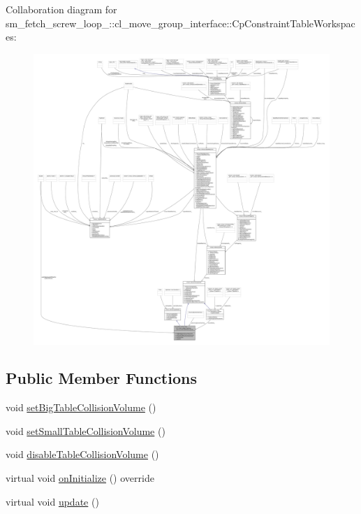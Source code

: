 Collaboration diagram for sm\+\_\+fetch\+\_\+screw\+\_\+loop\+\_\+:\+:cl\+\_\+move\+\_\+group\+\_\+interface\+:\+:Cp\+Constraint\+Table\+Workspaces\+:
\nopagebreak
\begin{figure}[H]
\begin{center}
\leavevmode
\includegraphics[width=350pt]{classsm__fetch__screw__loop__1_1_1cl__move__group__interface_1_1CpConstraintTableWorkspaces__coll__graph}
\end{center}
\end{figure}
\subsection*{Public Member Functions}
\begin{DoxyCompactItemize}
\item 
void \hyperlink{classsm__fetch__screw__loop__1_1_1cl__move__group__interface_1_1CpConstraintTableWorkspaces_ae9bf6937e39e58a069bce3d02b617402}{set\+Big\+Table\+Collision\+Volume} ()
\item 
void \hyperlink{classsm__fetch__screw__loop__1_1_1cl__move__group__interface_1_1CpConstraintTableWorkspaces_a9b66f921573b86d249ecafc3161d1308}{set\+Small\+Table\+Collision\+Volume} ()
\item 
void \hyperlink{classsm__fetch__screw__loop__1_1_1cl__move__group__interface_1_1CpConstraintTableWorkspaces_ad3923e3b459840a1cd0ff9f43821fecf}{disable\+Table\+Collision\+Volume} ()
\item 
virtual void \hyperlink{classsm__fetch__screw__loop__1_1_1cl__move__group__interface_1_1CpConstraintTableWorkspaces_a813b53264563225547f31651fd5b3f76}{on\+Initialize} () override
\item 
virtual void \hyperlink{classsm__fetch__screw__loop__1_1_1cl__move__group__interface_1_1CpConstraintTableWorkspaces_a24fc1c2ba2d6f09df2cca9bf0c3d3b20}{update} ()
\end{DoxyCompactItemize}
